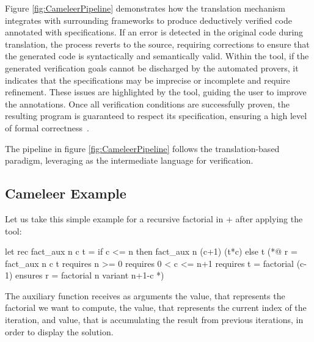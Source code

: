 Figure \ref{fig:CameleerPipeline} demonstrates how the translation mechanism integrates with surrounding frameworks to produce 
deductively verified \ocaml code annotated with \gospel specifications. If an error is detected in the original \ocaml code during 
translation, the process reverts to the source, requiring corrections to ensure that the generated \whyml code is syntactically and 
semantically valid. Within the \whythree tool, if the generated verification goals cannot be discharged by the automated provers, it indicates 
that the specifications may be imprecise or incomplete and require refinement. These issues are highlighted by the tool, guiding the 
user to improve the annotations. Once all verification conditions are successfully proven, the resulting program is guaranteed to 
respect its specification, ensuring a high level of formal correctness~\cite{Filliatre11}.


The \cameleer pipeline in figure \ref{fig:CameleerPipeline} follows the translation-based paradigm, 
leveraging \whyml as the intermediate language for verification.

\subsection{Cameleer Example}
\label{subsec:CameleerExample}

Let us take this simple example for a recursive factorial in \ocaml + \gospel after applying the \cameleer tool:

\begin{gospell}
let rec fact_aux n c t =
  if c <= n then fact_aux n (c+1) (t*c) else t
(*@
  r = fact_aux n c t
  requires n >= 0
  requires 0 < c <= n+1
  requires t = factorial (c-1)
  ensures r = factorial n
  variant n+1-c
*)
\end{gospell}

The auxiliary function  receives as arguments the  value, that represents the factorial we want to 
compute, the  value, that represents the current index of the iteration, and  value, that is accumulating 
the result from previous iterations, in order to display the solution.

